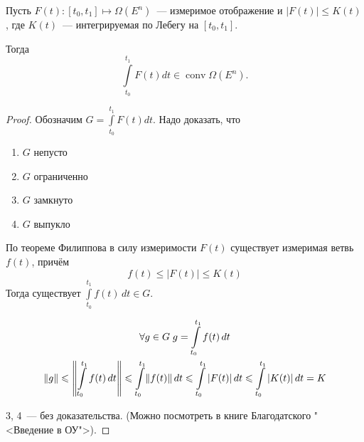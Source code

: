\begin{namedthm}
    Пусть $F(t)\colon [t_0, t_1] \mapsto \Omega(E^n)$~--- измеримое отображение и 
    $|F(t)| \leqslant K(t)$, где $K(t)$~--- интегрируемая по Лебегу на $[t_0, t_1]$.

    Тогда
    \begin{equation*}
        \int\limits_{t_0}^{t_1} F(t) dt \in \operatorname{conv} \Omega(E^n).
    \end{equation*}
\end{namedthm}
\begin{proof}
    Обозначим $G = \int\limits_{t_0}^{t_1} F(t) dt$.
    Надо доказать, что
    \begin{enumerate}
        \item $G$ непусто
        \item $G$ ограниченно 
        \item $G$ замкнуто
        \item $G$ выпукло
    \end{enumerate}

    По теореме Филиппова в силу измеримости $F(t)$ существует измеримая ветвь $f(t)$, причём 
    \begin{equation*}
        f(t) \leqslant |F(t)| \leqslant K(t)
    \end{equation*}
    Тогда существует $\int\limits_{t_0}^{t_1} f(t)\, dt \in G$.

    \begin{gather*}
        \forall g \in G \; g = \int\limits_{t_0}^{t_1} f(t)\, dt \\
        \lVert g \rVert \leqslant 
        \left\lVert \int\limits_{t_0}^{t_1} f(t)\, dt \right\rVert \leqslant
        \int\limits_{t_0}^{t_1} \lVert f(t) \rVert\, dt \leqslant
        \int\limits_{t_0}^{t_1} |F(t)| \, dt \leqslant
        \int\limits_{t_0}^{t_1} |K(t)| \, dt = K
    \end{gather*}

    3, 4~--- без доказательства. (Можно посмотреть в книге Благодатского "<Введение в ОУ">).
\end{proof}

